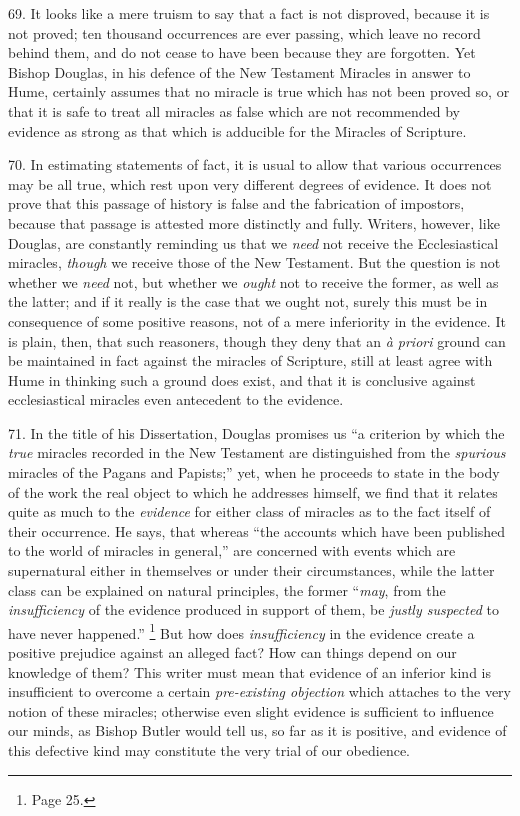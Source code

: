 69.
It looks like a mere truism to say that a fact is not disproved,
because it is not proved; ten thousand occurrences are ever passing,
which leave no record behind them, and do not cease to have been
because they are forgotten. Yet Bishop Douglas, in his defence of the
New Testament Miracles in answer to Hume, certainly assumes that no
miracle is true which has not been proved so, or that it is safe to
treat all miracles as false which are not recommended by evidence as
strong as that which is adducible for the Miracles of Scripture.

70.
In estimating statements of fact, it is usual to allow that various
occurrences may be all true, which rest upon very different degrees of
evidence. It does not prove that this passage of history is false and
the fabrication of impostors, because that passage is attested
more distinctly and fully. Writers, however, like Douglas, are
constantly reminding us that we \emph{need} not receive the Ecclesiastical
miracles, \emph{though} we receive those of the New Testament. But the
question is not whether we \emph{need} not, but whether we \emph{ought} not to
receive the former, as well as the latter; and if it really is the
case that we ought not, surely this must be in consequence of some
positive reasons, not of a mere inferiority in the evidence. It is
plain, then, that such reasoners, though they deny that an \emph{à
priori} ground can be maintained in fact against the miracles of
Scripture, still at least agree with Hume in thinking such a ground
does exist, and that it is conclusive against ecclesiastical miracles
even antecedent to the evidence.

71.
In the title of his Dissertation, Douglas promises us ``a criterion by
which the \emph{true} miracles recorded in the New Testament are
distinguished from the \emph{spurious} miracles of the Pagans and
Papists;'' yet, when he proceeds to state in the body of the work the
real object to which he addresses himself, we find that it relates
quite as much to the \emph{evidence} for either class of miracles as
to the fact itself of their occurrence. He says, that whereas ``the
accounts which have been published to the world of miracles in
general,'' are concerned with events which are supernatural either in
themselves or under their circumstances, while the latter class
can be explained on natural principles, the former ``\emph{may}, from
the \emph{insufficiency} of the evidence produced in support of them,
be \emph{justly suspected} to have never happened.'' \footnote{Page 25.} But how does \emph{insufficiency} in the evidence create a positive
prejudice against an alleged fact? How can things depend on our
knowledge of them? This writer must mean that evidence of an inferior
kind is insufficient to overcome a certain \emph{pre-existing objection}
which attaches to the very notion of these miracles; otherwise even
slight evidence is sufficient to influence our minds, as Bishop Butler
would tell us, so far as it is positive, and evidence of this
defective kind may constitute the very trial of our obedience.

